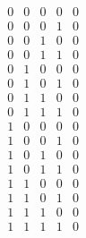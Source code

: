 \documentclass[letterpaper, 12pt]{article}
\begin{document}
\begin{enumerate}
\begin{enumerate}
\begin{enumerate}
\begin{displaymath}
\begin{array}{|c|c|c|c|c|}
                            \hline
                            0 & 0 & 0 & 0 & 0\\
                            0 & 0 & 0 & 1 & 0\\
                            0 & 0 & 1 & 0 & 0\\
                            0 & 0 & 1 & 1 & 0\\
                            0 & 1 & 0 & 0 & 0\\
                            0 & 1 & 0 & 1 & 0\\
                            0 & 1 & 1 & 0 & 0\\
                            0 & 1 & 1 & 1 & 0\\
                            1 & 0 & 0 & 0 & 0\\
                            1 & 0 & 0 & 1 & 0\\
                            1 & 0 & 1 & 0 & 0\\
                            1 & 0 & 1 & 1 & 0\\
                            1 & 1 & 0 & 0 & 0\\
                            1 & 1 & 0 & 1 & 0\\
                            1 & 1 & 1 & 0 & 0\\
                            1 & 1 & 1 & 1 & 0\\
                        \end{array}
                    \end{displaymath}
                \end{enumerate}
        \end{enumerate}
        

\end{enumerate}
\end{document}
